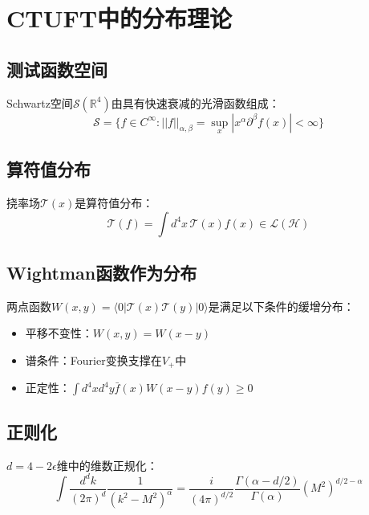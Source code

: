 \section{CTUFT中的分布理论}
\label{app:distribution}

\subsection{测试函数空间}

\begin{definition}[Schwartz空间]
Schwartz空间$\mathcal{S}(\mathbb{R}^4)$由具有快速衰减的光滑函数组成：
\begin{equation}
    \mathcal{S} = \{ f \in C^\infty : ||f||_{\alpha,\beta} = \sup_x |x^\alpha \partial^\beta f(x)| < \infty \}
\end{equation}
\end{definition}

\subsection{算符值分布}

挠率场$\mathcal{T}(x)$是算符值分布：
\begin{equation}
    \mathcal{T}(f) = \int d^4x \, \mathcal{T}(x) f(x) \in \mathcal{L}(\mathcal{H})
\end{equation}

\subsection{Wightman函数作为分布}

两点函数$W(x,y) = \langle 0 | \mathcal{T}(x)\mathcal{T}(y) | 0 \rangle$是满足以下条件的缓增分布：
\begin{itemize}
    \item 平移不变性：$W(x,y) = W(x-y)$
    \item 谱条件：Fourier变换支撑在$V_+$中
    \item 正定性：$\int d^4x d^4y \bar{f}(x) W(x-y) f(y) \geq 0$
\end{itemize}

\subsection{正则化}

$d = 4 - 2\epsilon$维中的维数正规化：
\begin{equation}
    \int \frac{d^d k}{(2\pi)^d} \frac{1}{(k^2 - M^2)^\alpha} = \frac{i}{(4\pi)^{d/2}} \frac{\Gamma(\alpha - d/2)}{\Gamma(\alpha)} (M^2)^{d/2 - \alpha}
\end{equation}
